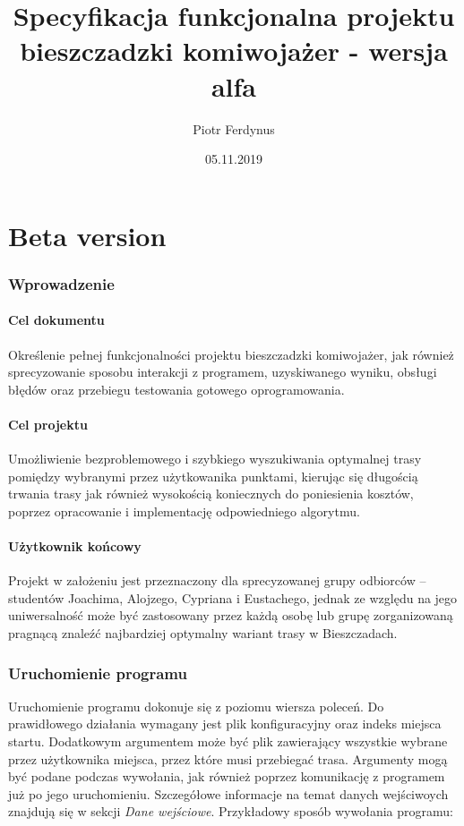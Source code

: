 \documentclass{article}
\title{Specyfikacja funkcjonalna projektu bieszczadzki komiwojażer  - wersja alfa}
\author{Piotr Ferdynus}
\date{05.11.2019}
\begin{document}
\maketitle

\part{Beta version}
\section{Wprowadzenie}
\subsection{Cel dokumentu}
Określenie pełnej funkcjonalności projektu bieszczadzki komiwojażer, jak również sprecyzowanie sposobu interakcji z programem, uzyskiwanego wyniku, obsługi błędów oraz przebiegu testowania gotowego oprogramowania.
\subsection{Cel projektu}
Umożliwienie bezproblemowego i szybkiego wyszukiwania optymalnej trasy pomiędzy wybranymi przez użytkowanika punktami, kierując się długością trwania trasy jak również wysokością koniecznych do poniesienia kosztów, poprzez opracowanie i implementację odpowiedniego algorytmu.
\subsection{Użytkownik końcowy}
Projekt w założeniu jest przeznaczony dla sprecyzowanej grupy odbiorców -- studentów Joachima, Alojzego, Cypriana i Eustachego, jednak ze względu na jego uniwersalność może być zastosowany przez każdą osobę lub grupę zorganizowaną pragnącą znaleźć najbardziej optymalny wariant trasy w Bieszczadach.
\section{Uruchomienie programu}
Uruchomienie programu dokonuje się z poziomu wiersza poleceń. Do prawidłowego działania wymagany jest plik konfiguracyjny oraz indeks miejsca startu. Dodatkowym argumentem może być plik zawierający wszystkie wybrane przez użytkownika miejsca, przez które musi przebiegać trasa. Argumenty mogą być podane podczas wywołania, jak również poprzez komunikację z programem już po jego uruchomieniu. Szczegółowe informacje na temat danych wejściwoych znajdują się w sekcji \textit{Dane wejściowe}. Przykładowy sposób wywołania programu:
\end{document}
